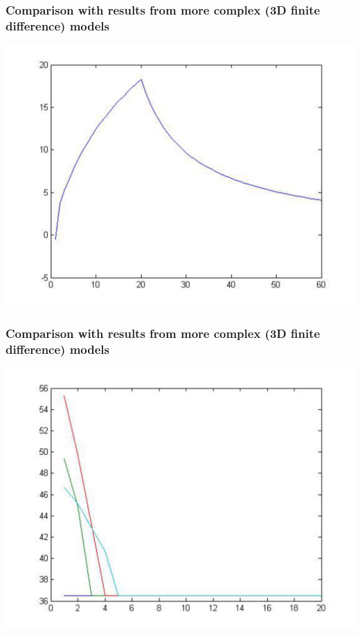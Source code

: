 \documentclass{beamer}
\begin{document}
\begin{frame}
\frametitle{Comparison with results from more complex (3D finite difference) models}
\begin{center}
\includegraphics[scale=0.4]{Pages/jmurleymaxtemp.pdf}
\end{center}
\end{frame}
\begin{frame}
\frametitle{Comparison with results from more complex (3D finite difference) models}
\begin{center}
\includegraphics[scale=0.4]{Pages/jmurleytemprising.pdf}
\end{center}
\end{frame}
\end{document}
